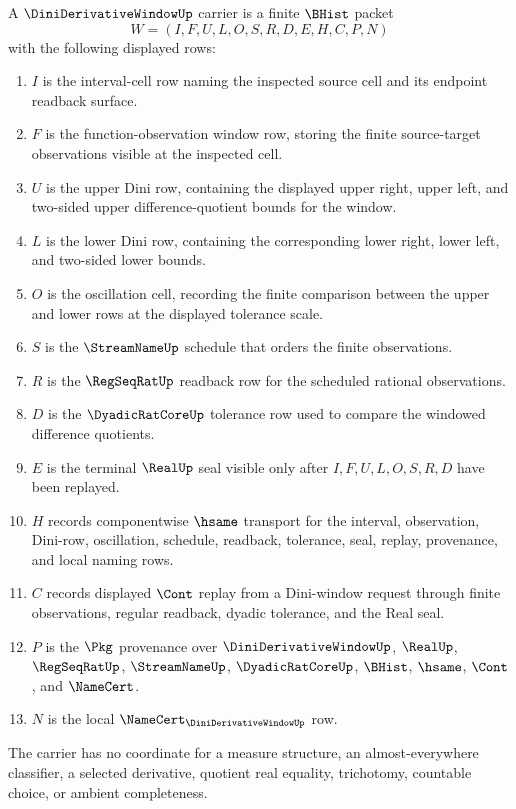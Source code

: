 \begin{definition}
\label{def:dini-derivative-window-carrier}
A $\DiniDerivativeWindowUp$ carrier is a finite $\BHist$ packet
$$
W=(I,F,U,L,O,S,R,D,E,H,C,P,N)
$$
with the following displayed rows:
\begin{enumerate}
\item $I$ is the interval-cell row naming the inspected source cell and its endpoint readback surface.
\item $F$ is the function-observation window row, storing the finite source-target observations visible at the inspected cell.
\item $U$ is the upper Dini row, containing the displayed upper right, upper left, and two-sided upper difference-quotient bounds for the window.
\item $L$ is the lower Dini row, containing the corresponding lower right, lower left, and two-sided lower bounds.
\item $O$ is the oscillation cell, recording the finite comparison between the upper and lower rows at the displayed tolerance scale.
\item $S$ is the $\StreamNameUp$ schedule that orders the finite observations.
\item $R$ is the $\RegSeqRatUp$ readback row for the scheduled rational observations.
\item $D$ is the $\DyadicRatCoreUp$ tolerance row used to compare the windowed difference quotients.
\item $E$ is the terminal $\RealUp$ seal visible only after $I,F,U,L,O,S,R,D$ have been replayed.
\item $H$ records componentwise $\hsame$ transport for the interval, observation, Dini-row, oscillation, schedule, readback, tolerance, seal, replay, provenance, and local naming rows.
\item $C$ records displayed $\Cont$ replay from a Dini-window request through finite observations, regular readback, dyadic tolerance, and the Real seal.
\item $P$ is the $\Pkg$ provenance over $\DiniDerivativeWindowUp$, $\RealUp$, $\RegSeqRatUp$, $\StreamNameUp$, $\DyadicRatCoreUp$, $\BHist$, $\hsame$, $\Cont$, and $\NameCert$.
\item $N$ is the local $\NameCert_{\DiniDerivativeWindowUp}$ row.
\end{enumerate}
The carrier has no coordinate for a measure structure, an almost-everywhere classifier, a selected derivative, quotient real equality, trichotomy, countable choice, or ambient completeness.
\end{definition}

